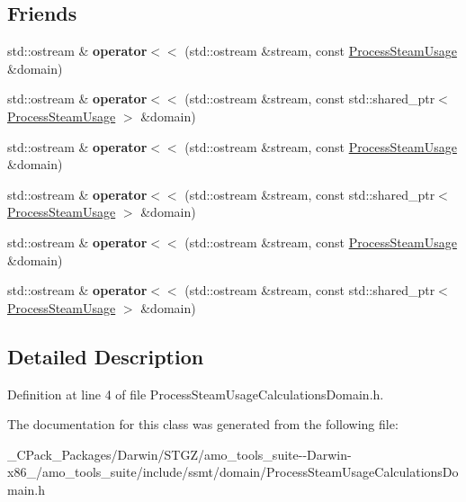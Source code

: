 \subsection*{Friends}
\begin{DoxyCompactItemize}
\item 
\mbox{\label{class_process_steam_usage_a17df063398d6e0d71331cca0ace29637}} 
std\+::ostream \& {\bfseries operator$<$$<$} (std\+::ostream \&stream, const \hyperlink{class_process_steam_usage}{Process\+Steam\+Usage} \&domain)
\item 
\mbox{\label{class_process_steam_usage_a5f93a82859a3d279b12bbc402b476619}} 
std\+::ostream \& {\bfseries operator$<$$<$} (std\+::ostream \&stream, const std\+::shared\+\_\+ptr$<$ \hyperlink{class_process_steam_usage}{Process\+Steam\+Usage} $>$ \&domain)
\item 
\mbox{\label{class_process_steam_usage_a17df063398d6e0d71331cca0ace29637}} 
std\+::ostream \& {\bfseries operator$<$$<$} (std\+::ostream \&stream, const \hyperlink{class_process_steam_usage}{Process\+Steam\+Usage} \&domain)
\item 
\mbox{\label{class_process_steam_usage_a5f93a82859a3d279b12bbc402b476619}} 
std\+::ostream \& {\bfseries operator$<$$<$} (std\+::ostream \&stream, const std\+::shared\+\_\+ptr$<$ \hyperlink{class_process_steam_usage}{Process\+Steam\+Usage} $>$ \&domain)
\item 
\mbox{\label{class_process_steam_usage_a17df063398d6e0d71331cca0ace29637}} 
std\+::ostream \& {\bfseries operator$<$$<$} (std\+::ostream \&stream, const \hyperlink{class_process_steam_usage}{Process\+Steam\+Usage} \&domain)
\item 
\mbox{\label{class_process_steam_usage_a5f93a82859a3d279b12bbc402b476619}} 
std\+::ostream \& {\bfseries operator$<$$<$} (std\+::ostream \&stream, const std\+::shared\+\_\+ptr$<$ \hyperlink{class_process_steam_usage}{Process\+Steam\+Usage} $>$ \&domain)
\end{DoxyCompactItemize}


\subsection{Detailed Description}


Definition at line 4 of file Process\+Steam\+Usage\+Calculations\+Domain.\+h.



The documentation for this class was generated from the following file\+:\begin{DoxyCompactItemize}
\item 
\+\_\+\+C\+Pack\+\_\+\+Packages/\+Darwin/\+S\+T\+G\+Z/amo\+\_\+tools\+\_\+suite-\/-\/\+Darwin-\/x86\+\_/amo\+\_\+tools\+\_\+suite/include/ssmt/domain/Process\+Steam\+Usage\+Calculations\+Domain.\+h\end{DoxyCompactItemize}
